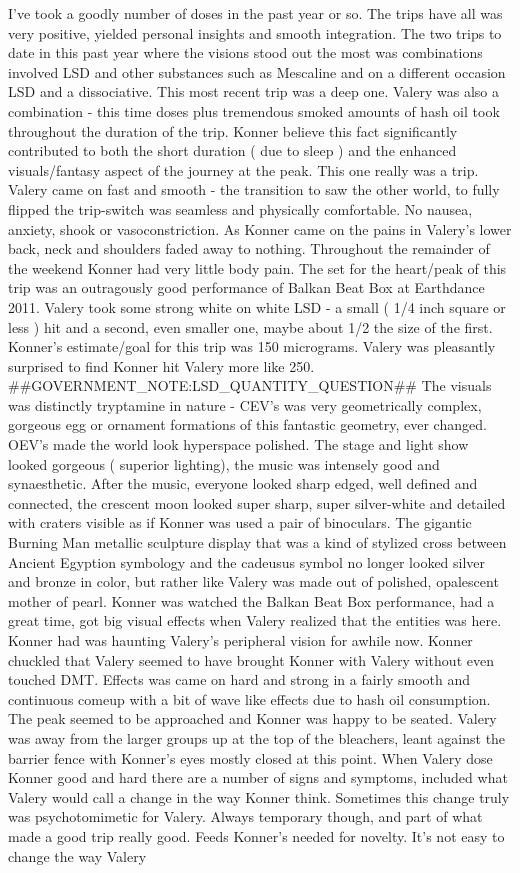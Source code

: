 \documentclass[12pt]{book}
\begin{document}
I've took a goodly number of doses in the past year or so. The trips have all was very positive, yielded personal insights and smooth integration. The two trips to date in this past year where the visions stood out the most was combinations involved LSD and other substances such as Mescaline and on a different occasion LSD and a dissociative. This most recent trip was a deep one. Valery was also a combination - this time doses plus tremendous smoked amounts of hash oil took throughout the duration of the trip. Konner believe this fact significantly contributed to both the short duration ( due to sleep ) and the enhanced visuals/fantasy aspect of the journey at the peak. This one really was a trip. Valery came on fast and smooth - the transition to saw the other world, to fully flipped the trip-switch was seamless and physically comfortable. No nausea, anxiety, shook or vasoconstriction. As Konner came on the pains in Valery's lower back, neck and shoulders faded away to nothing. Throughout the remainder of the weekend Konner had very little body pain. The set for the heart/peak of this trip was an outragously good performance of Balkan Beat Box at Earthdance 2011. Valery took some strong white on white LSD - a small ( 1/4 inch square or less ) hit and a second, even smaller one, maybe about 1/2 the size of the first. Konner's estimate/goal for this trip was 150 micrograms. Valery was pleasantly surprised to find Konner hit Valery more like 250. \#\#GOVERNMENT\_NOTE:LSD\_QUANTITY\_QUESTION\#\# The visuals was distinctly tryptamine in nature - CEV's was very geometrically complex, gorgeous egg or ornament formations of this fantastic geometry, ever changed. OEV's made the world look hyperspace polished. The stage and light show looked gorgeous ( superior lighting), the music was intensely good and synaesthetic. After the music, everyone looked sharp edged, well defined and connected, the crescent moon looked super sharp, super silver-white and detailed with craters visible as if Konner was used a pair of binoculars. The gigantic Burning Man metallic sculpture display that was a kind of stylized cross between Ancient Egyption symbology and the cadeusus symbol no longer looked silver and bronze in color, but rather like Valery was made out of polished, opalescent mother of pearl. Konner was watched the Balkan Beat Box performance, had a great time, got big visual effects when Valery realized that the entities was here. Konner had was haunting Valery's peripheral vision for awhile now. Konner chuckled that Valery seemed to have brought Konner with Valery without even touched DMT. Effects was came on hard and strong in a fairly smooth and continuous comeup with a bit of wave like effects due to hash oil consumption. The peak seemed to be approached and Konner was happy to be seated. Valery was away from the larger groups up at the top of the bleachers, leant against the barrier fence with Konner's eyes mostly closed at this point. When Valery dose Konner good and hard there are a number of signs and symptoms, included what Valery would call a change in the way Konner think. Sometimes this change truly was psychotomimetic for Valery. Always temporary though, and part of what made a good trip really good. Feeds Konner's needed for novelty. It's not easy to change the way Valery 
\end{document}
